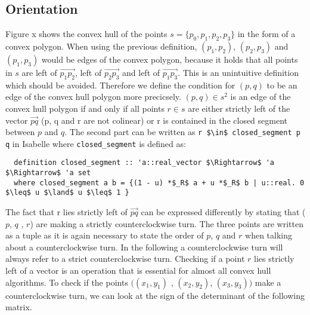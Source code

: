 \subsection{Orientation}
Figure x shows the convex hull of the points $s = \{p_0,p_1,p_2,p_3\}$ in the form of a convex polygon.
When using the previous definition, $(p_1,p_2)$, $(p_2,p_3)$ and $(p_1,p_3)$
would be edges of the convex polygon, because it holds that all points in $s$ are left 
of $\vec{p_1 p_2}$, left of $\vec{p_2 p_3}$ and left of $\vec{p_1 p_3}$. 
This is an unintuitive definition which should be avoided. Therefore we define the 
condition for $(p,q)$ to be an edge of the convex hull polygon more precicsely.
$(p,q) \in s^2$ is an edge of the convex hull polygon if and only if all points $r \in s$ 
are either strictly left of the vector $\vec{p q}$ (p, q and r are not colinear) or 
r is contained in the closed segment between $p$ and $q$. The second part can be written
as \lstinline|r $\in$ closed_segment p q| in Isabelle where \lstinline|closed_segment| is
defined as:
\begin{lstlisting}
  definition closed_segment :: 'a::real_vector $\Rightarrow$ 'a $\Rightarrow$ 'a set
  where closed_segment a b = {(1 - u) *$_R$ a + u *$_R$ b | u::real. 0 $\leq$ u $\land$ u $\leq$ 1 }
\end{lstlisting}
The fact that r lies strictly left 
of $\vec{p q}$ can be expressed differently by stating that ($p$, $q$ , $r$) 
are making a strictly counterclockwise turn. The three points are written as 
a tuple as it is again necessary to state the order of 
$p$, $q$ and $r$ when talking about a counterclockwise turn. In the following a counterclockwise turn will always refer to a strict 
counterclockwise turn. Checking if a point $r$ lies
strictly left of a vector is an operation that is essential for almost all
convex hull algorithms. To check if the points $((x_1,y_1)$ , $(x_2,y_2)$, $(x_3,y_3))$
make a counterclockwise turn, we can look at the sign of the determinant of the 
following matrix.


